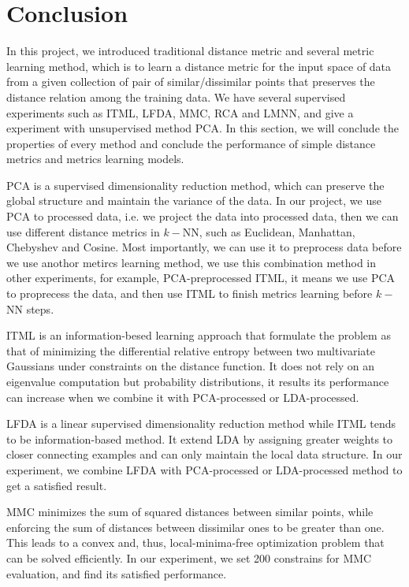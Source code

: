 \documentclass[conference]{IEEEtran}
\begin{document}
\section{Conclusion}

In this project, we introduced traditional distance metric and several metric learning method, which is to learn a distance metric for the input space of data from a given collection of pair of similar/dissimilar points that preserves the distance relation among the training data. We have several supervised experiments such as ITML, LFDA, MMC, RCA and LMNN, and give a experiment with unsupervised method PCA. In this section, we will conclude the properties of every method and conclude the performance of simple distance metrics and metrics learning models.

PCA is a supervised dimensionality reduction method, which can preserve the global structure and maintain the variance of the data. In our project, we use PCA to processed data, i.e. we project the data into processed data, then we can use different distance metrics in $k-$NN, such as Euclidean, Manhattan, Chebyshev and Cosine. Most importantly, we can use it to preprocess data before we use anothor metircs learning method, we use this combination method in other experiments, for example, PCA-preprocessed ITML, it means we use PCA to proprecess the data, and then use ITML to finish metrics learning before $k-$NN steps.

ITML is an information-besed learning approach that formulate the problem as that of minimizing the differential relative entropy between two multivariate Gaussians under constraints on the distance function\cite{Davis2007Information}. It does not rely on an eigenvalue computation but probability distributions, it results its performance can increase when we combine it with PCA-processed or LDA-processed.

LFDA is a linear supervised dimensionality reduction method while ITML tends to be information-based method. It extend LDA by assigning greater weights to closer connecting examples and can only maintain the local data structure. In our experiment, we combine LFDA with PCA-processed or LDA-processed method to get a satisfied result.

MMC minimizes the sum of squared distances between similar points, while enforcing the sum of distances between dissimilar ones to be greater than one. This leads to a convex and, thus, local-minima-free optimization problem that can be solved efficiently. In our experiment, we set 200 constrains for MMC evaluation, and find its satisfied performance.
\end{document}

